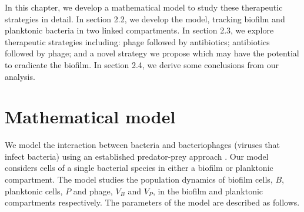 In this chapter, we develop a mathematical model to study these therapeutic strategies in detail.  In section 2.2, we develop the model, tracking biofilm and planktonic bacteria in two linked compartments. In section 2.3, we explore therapeutic strategies including: phage followed by antibiotics; antibiotics followed by phage; and a novel strategy we propose which may have the potential to eradicate the biofilm. In section 2.4, we derive some conclusions from our analysis.

\section{Mathematical model}

We model the interaction between bacteria and bacteriophages (viruses that infect bacteria) using an established predator-prey approach \citep{lenski_dynamics_1988}. %
Our model considers cells of a single bacterial species in either a biofilm or planktonic compartment.   The model studies the population dynamics of biofilm cells, $B$, planktonic cells, $P$ and phage, $V_B$ and $V_P$, in the biofilm and planktonic compartments respectively.  The parameters of the model are described as follows.\\
 
